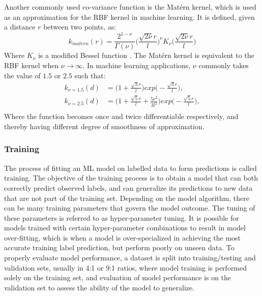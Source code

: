 Another commonly used co-variance function is the Mat\'{e}rn kernel, which is used as an approximation for the RBF kernel in machine learning. It is defined, given a distance $r$ between two points, as:
\begin{equation}
k_{matern}(r) = \frac{2^{1-\nu}}{\Gamma(\nu)}\bigg(\frac{\sqrt{2\nu}r}{l}\bigg)^{\nu}K_{\nu}\bigg(\frac{\sqrt{2\nu}r}{l}\bigg)
\end{equation}
Where $K_\nu$ is a modified Bessel function \cite{rasmussen2006gaussian}. The Mat\'{e}rn kernel is equivalent to the RBF kernel when $\nu\rightarrow\infty$. In machine learning applications, $\nu$ commonly takes the value of $1.5$ or $2.5$ such that:
\begin{equation}
\begin{split}
k_{\nu=1.5}(d) &= \bigg(1+\frac{\sqrt{3}r}{l}\bigg)exp\bigg(-\frac{\sqrt{3}r}{l}\bigg), \\
k_{\nu=2.5}(d) &= \bigg(1+\frac{\sqrt{5}r}{l}+\frac{5r^2}{3l^2}\bigg)exp\bigg(-\frac{\sqrt{5}r}{l}\bigg), \\
\end{split}
\end{equation}
Where the function becomes once and twice differentiable respectively, and thereby having different degree of smoothness of approximation. 
 
\subsubsection{Training}
The process of fitting an ML model on labelled data to form predictions is called training. The objective of the training process is to obtain a model that can both correctly predict observed labels, and can generalize its predictions to new data that are not part of the training set. Depending on the model algorithm, there can be many training parameters that govern the model outcome. The tuning of these parameters is referred to as hyper-parameter tuning. It is possible for models trained with certain hyper-parameter combinations to result in model over-fitting, which is when a model is over-specialized in achieving the most accurate training label prediction, but perform poorly on unseen data. To properly evaluate model performance, a dataset is split into training/testing and validation sets, usually in 4:1 or 9:1 ratios, where model training is performed solely on the training set, and evaluation of model performance is on the validation set to assess the ability of the model to generalize.

